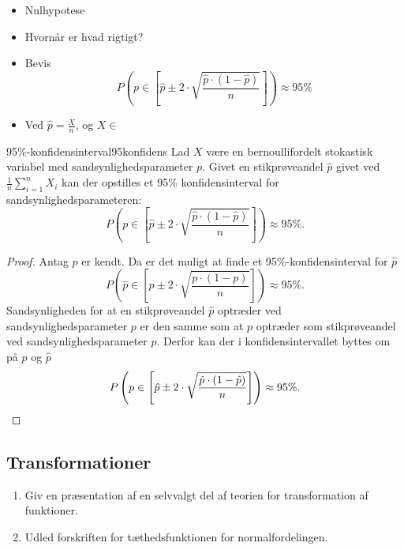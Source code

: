 \documentclass{article}
\begin{document}
\begin{itemize}
    \item Nulhypotese
    \item Hvornår er hvad rigtigt?
    \item Bevis
        \[
            P(p\in[\hat p \pm 2\cdot\sqrt{\frac{\hat p\cdot(1-\hat p)}{n}}]) \approx 95\%
        \]
    \item Ved $\hat p = \frac{X}{n}$, og $X \in $
\end{itemize}

\begin{theorem}{95\%-konfidensinterval}{95konfidens}
    Lad $X$ være en bernoullifordelt stokastisk variabel med
    sandsynlighedsparameter $p$. Givet en stikprøveandel $\hat{p}$ givet ved
    $\frac{1}{n}\sum_{i=1}^n X_i$ kan der opstilles et 95\% konfidensinterval
    for sandsynlighedsparameteren:
    \[
        P\left(p\in\left[\hat p \pm 2\cdot\sqrt{\frac{\hat p\cdot(1-\hat p)}{n}}\right]\right)
        \approx 95\%.
    \] 
\end{theorem}

\begin{proof}
    Antag $p$ er kendt. Da er det muligt at finde et 95\%-konfidensinterval for
    $\hat{p}$
    \[
        P\left(\hat{p}\in\left[p \pm 2\cdot\sqrt{\frac{p\cdot(1-p)}{n}}\right]\right)
        \approx 95\%.
    \] 
    Sandsynligheden for at en stikprøveandel $\hat{p}$ optræder ved
    sandsynlighedsparameter $p$ er den samme som at $p$ optræder som
    stikprøveandel ved sandsynlighedsparameter $\hat{p}$. Derfor kan der i
    konfidensintervallet byttes om på $p$ og $\hat{p}$
    \[
        P\left(p\in\left[\hat p \pm 2\cdot\sqrt{\frac{\hat p\cdot(1-\hat p)}{n}}\right]\right)
        \approx 95\%.\qedhere
    \] 
\end{proof}

\begin{tcolorbox}
    \section{Transformationer}
    \tcblower
    \begin{enumerate}
        \item Giv en præsentation af en selvvalgt del af teorien for transformation af funktioner.
        \item Udled forskriften for tæthedsfunktionen for normalfordelingen. 
    \end{enumerate}
\end{tcolorbox}
\end{document}
